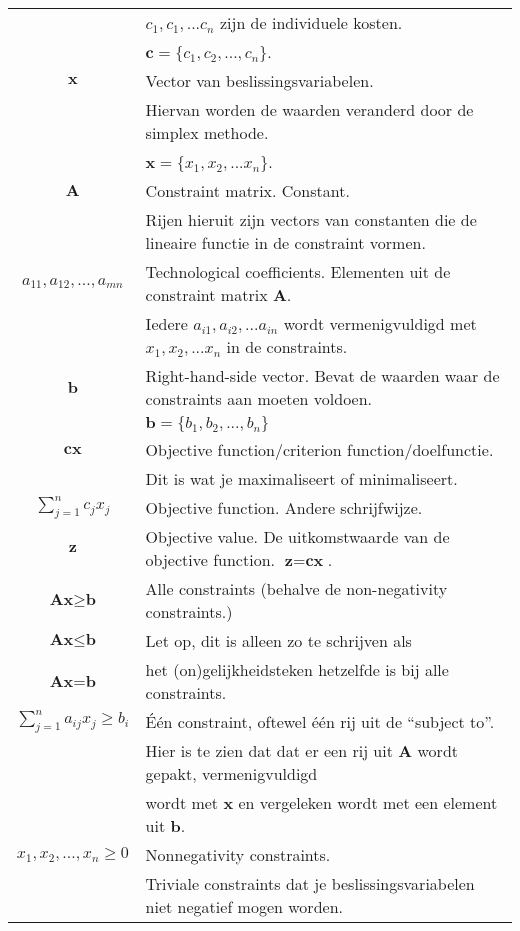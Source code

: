 \documentclass[10pt,a4paper]{article}
\begin{document}
\begin{tabular}{|c|l|}
 & $c_1, c_1, ... c_n$ zijn de individuele kosten. \\ & $\textbf{c} = \{c_1, c_2, ..., c_n\}$. \\ 
\hline 
$\textbf{x}$ & Vector van beslissingsvariabelen. \\ & Hiervan worden de waarden veranderd door de simplex methode. \\ & $\textbf{x} = \{x_1, x_2, ... x_n\}$. \\
\hline
$\textbf{A}$ & Constraint matrix. Constant. \\ & Rijen hieruit zijn vectors van constanten die de lineaire functie in de constraint vormen.\\
\hline
$a_{11}, a_{12}, ..., a_{mn}$ & Technological coefficients. Elementen uit de constraint matrix $\textbf{A}$.\\
& Iedere $a_{i1}, a_{i2}, ... a_{in}$ wordt vermenigvuldigd met $x_1, x_2, ... x_n$ in de constraints. \\
\hline
$\textbf{b}$ & Right-hand-side vector. Bevat de waarden waar de constraints aan moeten voldoen.\\
 & $\textbf{b} = \{b_1, b_2, ..., b_n\}$\\
\hline
$\textbf{cx}$ & Objective function/criterion function/doelfunctie. \\ & 	Dit is wat je maximaliseert of minimaliseert.\\
\hline
$\displaystyle\sum\limits_{j=1}^n c_jx_j$ & Objective function. Andere schrijfwijze. \\
\hline
$\textbf{z}$ & Objective value. De uitkomstwaarde van de objective function. $\textbf{z} = \textbf{cx}$.\\
\hline
$\textbf{Ax} \geq \textbf{b}$ & Alle constraints (behalve de non-negativity constraints.)\\
$\textbf{Ax} \leq \textbf{b}$ & Let op, dit is alleen zo te schrijven als \\
$\textbf{Ax} = \textbf{b}$ & het (on)gelijkheidsteken hetzelfde is bij alle constraints.\\
\hline
$\displaystyle\sum\limits_{j=1}^n a_{ij}x_j \ge b_i$ & Één constraint, oftewel één rij uit de ``subject to''.\\
 & Hier is te zien dat dat er een rij uit $\textbf{A}$ wordt gepakt, vermenigvuldigd \\ &  wordt met $\textbf{x}$ en vergeleken wordt met een element uit $\textbf{b}$. \\
\hline
$x_1, x_2, ..., x_n \geq 0$ & Nonnegativity constraints. \\ & Triviale constraints dat je beslissingsvariabelen niet negatief mogen worden.\\ 

\end{tabular}
\end{document}
